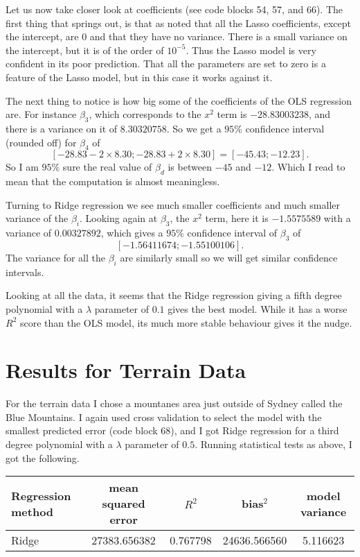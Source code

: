 \documentclass[parskip=half]{scrartcl}
\theoremstyle{definition}
\theoremstyle{remark}
\begin{document}
Let us now take closer look at coefficients (see code blocks 54, 57, and 66).
The first thing that springs out, is that as noted that all the Lasso coefficients, except the intercept, are $0$ and that they have no variance. 
There is a small variance on the intercept, but it is of the order of $10^{-5}$. 
Thus the Lasso model is very confident in its poor prediction. 
That all the parameters are set to zero is a feature of the Lasso model, but in this case it works against it. 

The next thing to notice is how big some of the coefficients of the OLS regression are.
For instance $\beta_3$, which corresponds to the $x^2$ term is $-28.83003238$, and there is a variance on it of $8.30320758$.
So we get a $95\%$ confidence interval (rounded off) for $\beta_4$ of 
\[
	[-28.83 - 2 \times 8.30; -28.83 + 2 \times 8.30] = [-45.43; -12.23].  
\]
So I am $95\%$ sure the real value of $\beta_d$ is between $-45$ and $-12$.
Which I read to mean that the computation is almost meaningless. 

Turning to Ridge regression we see much smaller coefficients and much smaller variance of the $\beta_i$. 
Looking again at $\beta_3$, the $x^2$ term, here it is $-1.5575589$ with a variance of $0.00327892$, which gives a $95\%$ confidence interval of $\beta_3$ of 
\[
	[-1.56411674; -1.55100106].
\]
The variance for all the $\beta_i$ are similarly small so we will get similar confidence intervals. 

Looking at all the data, it seems that the Ridge regression giving a fifth degree polynomial with a $\lambda$ parameter of $0.1$ gives the best model. 
While it has a worse $R^2$ score than the OLS model, its much more stable behaviour gives it the nudge. 

\section{Results for Terrain Data}

For the terrain data I chose a mountanes area just outside of Sydney called the Blue Mountains. 
I again used cross validation to select the model with the smallest predicted error (code block 68), and I got Ridge regression for a third degree polynomial with a $\lambda$ parameter of $0.5$.
Running statistical tests as above, I got the following.

\begin{tabular}{l|cccc}
Regression method & mean squared error & $R^2$ & bias$^2$ & model variance  \\ 
\hline
\hline 
Ridge & 27383.656382 & 0.767798 & 24636.566560 & 5.116623 \\ 
\end{tabular} 
\end{document}

